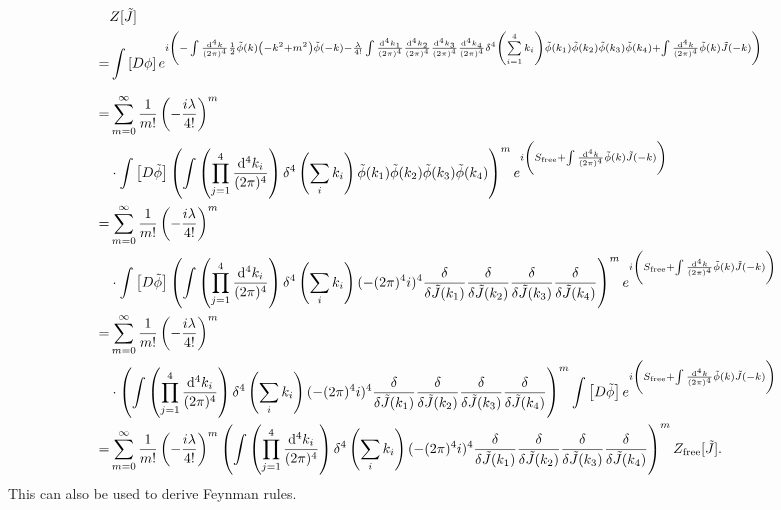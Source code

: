 \begin{align*}
	&Z[\tilde{J}] \\
   =& \pinte{}{\phi}e^{i\left(-\inte{}{}\frac{\dd[4]{k}}{(2\pi)^{4}}\frac{1}{2}\tilde{\phi}(k)\left(-k^{2} + m^{2}\right)\tilde{\phi}(-k) - \frac{\lambda}{4!}\inte{}{}\frac{\dd[4]{k}_{1}}{(2\pi)^{4}}\frac{\dd[4]{k}_{2}}{(2\pi)^{4}}\frac{\dd[4]{k}_{3}}{(2\pi)^{4}}\frac{\dd[4]{k}_{4}}{(2\pi)^{4}}\delta^{4}\left(\sum\limits_{i = 1}^{4}k_{i}\right)\tilde{\phi}(k_{1})\tilde{\phi}(k_{2})\tilde{\phi}(k_{3})\tilde{\phi}(k_{4}) + \inte{}{}\frac{\dd[4]{k}}{(2\pi)^{4}}\tilde{\phi}(k)\tilde{J}(-k)\right)} \\
   =& \sum\limits_{m = 0}^{\infty}\frac{1}{m!}\left(-\frac{i\lambda}{4!}\right)^{m} \\
    &\cdot\pinte{}{\tilde{\phi}}\left(\inte{}{}\left(\prod\limits_{j = 1}^{4}\frac{\dd[4]{k_{i}}}{(2\pi)^{4}}\right)\delta^{4}\left(\sum\limits_{i}k_{i}\right)\tilde{\phi}(k_{1})\tilde{\phi}(k_{2})\tilde{\phi}(k_{3})\tilde{\phi}(k_{4})\right)^{m}e^{i\left(S_{\text{free}} + \inte{}{}\frac{\dd[4]{k}}{(2\pi)^{4}}\tilde{\phi}(k)\tilde{J}(-k)\right)} \\
   =& \sum\limits_{m = 0}^{\infty}\frac{1}{m!}\left(-\frac{i\lambda}{4!}\right)^{m} \\
    &\cdot\pinte{}{\tilde{\phi}}\left(\inte{}{}\left(\prod\limits_{j = 1}^{4}\frac{\dd[4]{k_{i}}}{(2\pi)^{4}}\right)\delta^{4}\left(\sum\limits_{i}k_{i}\right)(-(2\pi)^{4}i)^{4}\fdv{\tilde{J}(k_{1})}\fdv{\tilde{J}(k_{2})}\fdv{\tilde{J}(k_{3})}\fdv{\tilde{J}(k_{4})}\right)^{m}e^{i\left(S_{\text{free}} + \inte{}{}\frac{\dd[4]{k}}{(2\pi)^{4}}\tilde{\phi}(k)\tilde{J}(-k)\right)} \\
   =& \sum\limits_{m = 0}^{\infty}\frac{1}{m!}\left(-\frac{i\lambda}{4!}\right)^{m} \\
    &\cdot\left(\inte{}{}\left(\prod\limits_{j = 1}^{4}\frac{\dd[4]{k_{i}}}{(2\pi)^{4}}\right)\delta^{4}\left(\sum\limits_{i}k_{i}\right)(-(2\pi)^{4}i)^{4}\fdv{\tilde{J}(k_{1})}\fdv{\tilde{J}(k_{2})}\fdv{\tilde{J}(k_{3})}\fdv{\tilde{J}(k_{4})}\right)^{m}\pinte{}{\tilde{\phi}}e^{i\left(S_{\text{free}} + \inte{}{}\frac{\dd[4]{k}}{(2\pi)^{4}}\tilde{\phi}(k)\tilde{J}(-k)\right)} \\
   =& \sum\limits_{m = 0}^{\infty}\frac{1}{m!}\left(-\frac{i\lambda}{4!}\right)^{m}\left(\inte{}{}\left(\prod\limits_{j = 1}^{4}\frac{\dd[4]{k_{i}}}{(2\pi)^{4}}\right)\delta^{4}\left(\sum\limits_{i}k_{i}\right)(-(2\pi)^{4}i)^{4}\fdv{\tilde{J}(k_{1})}\fdv{\tilde{J}(k_{2})}\fdv{\tilde{J}(k_{3})}\fdv{\tilde{J}(k_{4})}\right)^{m}Z_{\text{free}}[\tilde{J}].
\end{align*}
This can also be used to derive Feynman rules.

